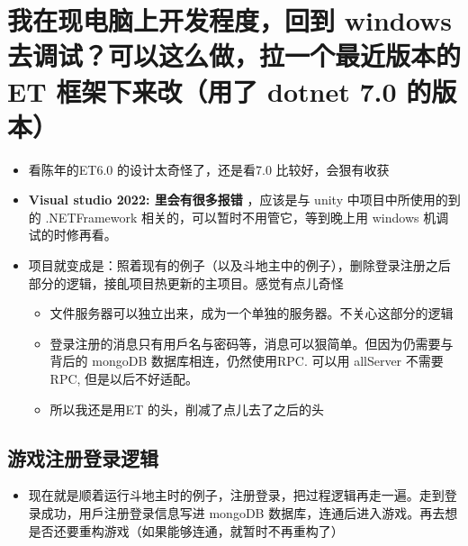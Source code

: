 \documentclass[9pt, b5paper]{article}
\begin{document}
\section{我在现电脑上开发程度，回到 windows 去调试？可以这么做，拉一个最近版本的ET 框架下来改（用了 dotnet 7.0 的版本）}
\label{sec-8}
\begin{itemize}
\item 看陈年的ET6.0 的设计太奇怪了，还是看7.0 比较好，会狠有收获
\item \textbf{Visual studio 2022: 里会有很多报错} ，应该是与 unity 中项目中所使用的到的 .NETFramework 相关的，可以暂时不用管它，等到晚上用 windows 机调试的时修再看。
\item 项目就变成是：照着现有的例子（以及斗地主中的例子），删除登录注册之后部分的逻辑，接臫项目热更新的主项目。感觉有点儿奇怪
\begin{itemize}
\item 文件服务器可以独立出来，成为一个单独的服务器。不关心这部分的逻辑
\item 登录注册的消息只有用戶名与密码等，消息可以狠简单。但因为仍需要与背后的 mongoDB 数据库相连，仍然使用RPC. 可以用 allServer 不需要 RPC, 但是以后不好适配。
\item 所以我还是用ET 的头，削减了点儿去了之后的头
\end{itemize}
\end{itemize}
\subsection{游戏注册登录逻辑}
\label{sec-8-1}
\begin{itemize}
\item 现在就是顺着运行斗地主时的例子，注册登录，把过程逻辑再走一遍。走到登录成功，用戶注册登录信息写进 mongoDB 数据库，连通后进入游戏。再去想是否还要重构游戏（如果能够连通，就暂时不再重构了）
\end{itemize}
\end{document}
